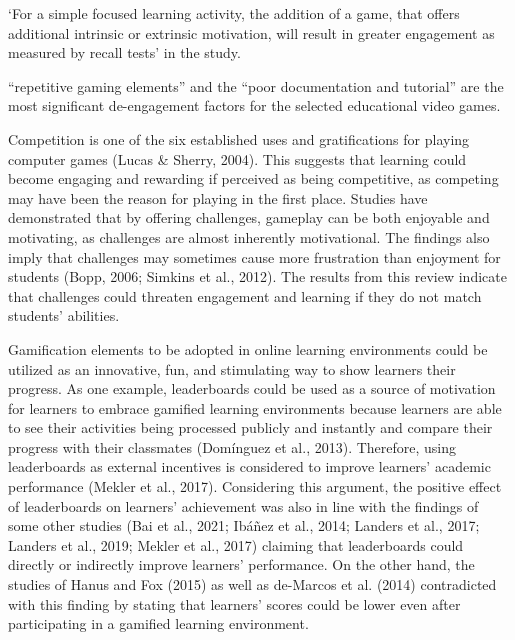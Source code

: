 \documentclass[]{VUMIFTemplateClass}
\begin{document}
‘For a simple focused learning activity, the addition of a game, that offers additional intrinsic or extrinsic motivation, will result in greater engagement as measured by recall tests' in the study. \cite{Gamification}


 “repetitive gaming elements” and the “poor documentation and tutorial” are the most significant de-engagement factors for the selected educational video games. \cite{LearningMotivation}


Competition is one of the six established uses and gratifications for playing computer games (Lucas \& Sherry, 2004). This suggests that learning could become engaging and rewarding if perceived as being competitive, as competing may have been the reason for playing in the first place.
Studies have demonstrated that by offering challenges, gameplay can be both enjoyable and motivating, as challenges are almost inherently motivational.
The findings also imply that challenges may sometimes cause more frustration than enjoyment for students (Bopp, 2006; Simkins et al., 2012). The results from this review indicate that challenges could threaten engagement and learning if they do not match students’ abilities. \cite{GameplayEngagement}


Gamification elements to be adopted in online learning environments could be utilized as an innovative, fun, and stimulating way to show learners their progress. As one example, leaderboards could be used as a source of motivation for learners to embrace gamified learning environments because learners are 
able to see their activities being processed publicly and instantly and compare their progress with their classmates (Domínguez et al., 2013). Therefore, using leaderboards as external incentives is considered to improve learners’ academic performance (Mekler et al., 2017). Considering this argument, the 
positive effect of leaderboards on learners’ achievement was also in line with the findings of some other studies (Bai et al., 2021; Ibáñez et al., 2014; Landers et al., 2017; Landers et al., 2019; Mekler et al., 2017) claiming that leaderboards could directly or indirectly improve learners’ performance. 
On the other hand, the studies of Hanus and Fox (2015) as well as de-Marcos et al. (2014) contradicted with this finding by stating that learners’ scores could be lower even after participating in a gamified learning environment. 
\end{document}
